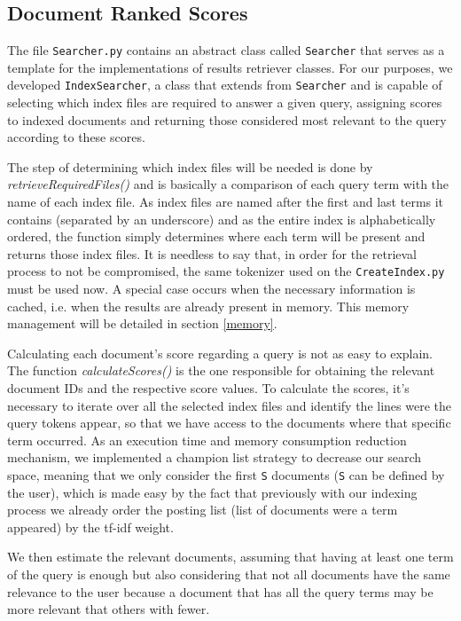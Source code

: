 \documentclass[12pt]{article}
\begin{document}
\subsection{Document Ranked Scores}

The file \texttt{Searcher.py} contains an abstract class called \texttt{Searcher}
that serves as a template for the implementations of results retriever classes.
For our purposes, we developed \texttt{IndexSearcher}, a class that extends from
\texttt{Searcher} and is capable of selecting which index files are required to 
answer a given query, assigning scores to indexed documents and returning those 
considered most relevant to the query according to these scores.

The step of determining which index files will be needed is done by 
\textit{retrieveRequiredFiles()} and is basically a comparison of each query 
term with the name of each index file.
As index files are named after the first and last terms it contains (separated
by an underscore) and as the entire index is alphabetically ordered, the function
simply determines where each term will be present and returns those index files. 
It is needless to say that, in order for the retrieval process to not be compromised, 
the same tokenizer used on the \texttt{CreateIndex.py} must be used now.
A special case occurs when the necessary information is cached, i.e. when the 
results are already present in memory. 
This memory management will be detailed in section \ref{memory}.

Calculating each document's score regarding a query is not as easy to explain. 
The function \textit{calculateScores()} is the one responsible for obtaining the 
relevant document IDs and the respective score values. 
To calculate the scores, it's necessary to iterate over all the selected index 
files and identify the lines were the query tokens appear, so that we have access 
to the documents where that specific term occurred.
As an execution time and memory consumption reduction mechanism, we implemented 
a champion list strategy to decrease our search space, meaning that we only 
consider the first \texttt{S} documents (\texttt{S} can be defined by the user), 
which is made easy by the fact that previously with our indexing process we 
already order the posting list (list of documents were a term appeared) by the 
tf-idf weight.

We then estimate the relevant documents, assuming that having at least one term 
of the query is enough but also considering that not all documents have the same 
relevance to the user because a document that has all the query terms may be more 
relevant that others with fewer.
\end{document}
